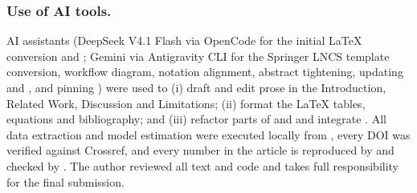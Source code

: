 \begin{credits}
\subsubsection{Use of AI tools.}
AI assistants (DeepSeek V4.1 Flash via OpenCode for the initial LaTeX conversion and ; Gemini via Antigravity CLI for the Springer LNCS template conversion, workflow diagram, notation alignment, abstract tightening, updating  and , and pinning ) were used to (i) draft and edit prose in the Introduction, Related Work, Discussion and Limitations; (ii) format the LaTeX tables, equations and bibliography; and (iii) refactor parts of  and  and integrate . All data extraction and model estimation were executed locally from , every DOI was verified against Crossref, and every number in the article is reproduced by  and checked by . The author reviewed all text and code and takes full responsibility for the final submission.

\end{credits}
